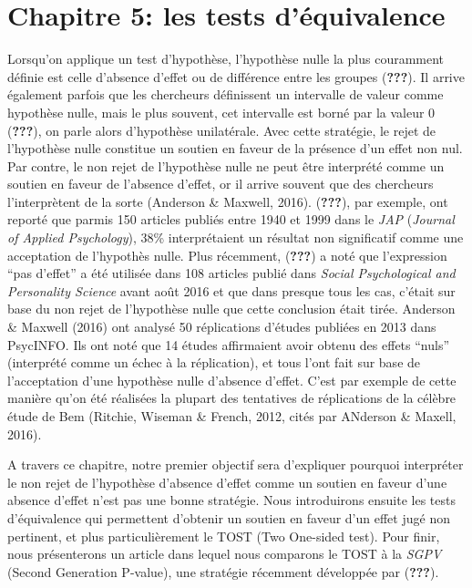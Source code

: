 \documentclass[
  english,
  man]{apa6}
\author{\phantom{0}}
\date{}
\affiliation{\phantom{0}}
\begin{document}
\hypertarget{chapitre-5-les-tests-duxe9quivalence}{%
\section{Chapitre 5: les tests d'équivalence}\label{chapitre-5-les-tests-duxe9quivalence}}

Lorsqu'on applique un test d'hypothèse, l'hypothèse nulle la plus couramment définie est celle d'absence d'effet ou de différence entre les groupes ({\textbf{???}}). Il arrive également parfois que les chercheurs définissent un intervalle de valeur comme hypothèse nulle, mais le plus souvent, cet intervalle est borné par la valeur 0 ({\textbf{???}}), on parle alors d'hypothèse unilatérale. Avec cette stratégie, le rejet de l'hypothèse nulle constitue un soutien en faveur de la présence d'un effet non nul. Par contre, le non rejet de l'hypothèse nulle ne peut être interprété comme un soutien en faveur de l'absence d'effet, or il arrive souvent que des chercheurs l'interprètent de la sorte (Anderson \& Maxwell, 2016). ({\textbf{???}}), par exemple, ont reporté que parmis 150 articles publiés entre 1940 et 1999 dans le \emph{JAP} (\emph{Journal of Applied Psychology}), 38\% interprétaient un résultat non significatif comme une acceptation de l'hypothès nulle. Plus récemment, ({\textbf{???}}) a noté que l'expression \enquote{pas d'effet} a été utilisée dans 108 articles publié dans \emph{Social Psychological and Personality Science} avant août 2016 et que dans presque tous les cas, c'était sur base du non rejet de l'hypothèse nulle que cette conclusion était tirée. Anderson \& Maxwell (2016) ont analysé 50 réplications d'études publiées en 2013 dans PsycINFO. Ils ont noté que 14 études affirmaient avoir obtenu des effets \enquote{nuls} (interprété comme un échec à la réplication), et tous l'ont fait sur base de l'acceptation d'une hypothèse nulle d'absence d'effet. C'est par exemple de cette manière qu'on été réalisées la plupart des tentatives de réplications de la célèbre étude de Bem (Ritchie, Wiseman \& French, 2012, cités par ANderson \& Maxell, 2016).

A travers ce chapitre, notre premier objectif sera d'expliquer pourquoi interpréter le non rejet de l'hypothèse d'absence d'effet comme un soutien en faveur d'une absence d'effet n'est pas une bonne stratégie. Nous introduirons ensuite les tests d'équivalence qui permettent d'obtenir un soutien en faveur d'un effet jugé non pertinent, et plus particulièrement le TOST (Two One-sided test). Pour finir, nous présenterons un article dans lequel nous comparons le TOST à la \emph{SGPV} (Second Generation P-value), une stratégie récemment développée par ({\textbf{???}}).
\end{document}
